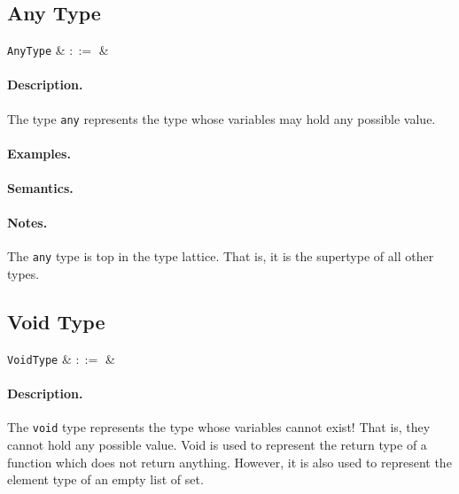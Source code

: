 
\subsection{Any Type}

\begin{syntax}
  \verb+AnyType+ & $::=$ &  \\
\end{syntax}

\paragraph{Description.}  The type \lstinline{any} represents the type whose variables may hold any possible value.

\paragraph{Examples.}

\paragraph{Semantics.}

\paragraph{Notes.} The \lstinline{any} type is top in the type
lattice.  That is, it is the supertype of all other types.


\subsection{Void Type}

\begin{syntax}
   \verb+VoidType+ & $::=$ &  \\
\end{syntax}

\paragraph{Description.} The \lstinline{void} type represents the type whose variables cannot exist! That is, they cannot hold any possible value. Void is used to represent the return type of a function which does not return anything. However, it is also
used to represent the element type of an empty list of set. 

